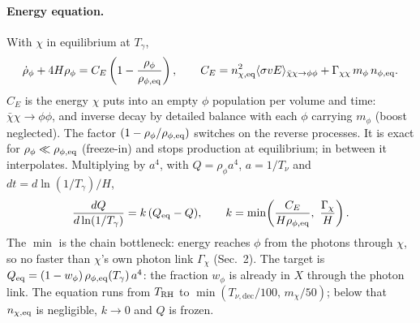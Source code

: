 \documentclass{article}
\newcommand{\Tnu}{T_{\nu,\mathrm{dec}}}
\begin{document}
\paragraph{Energy equation.} With $\chi$ in equilibrium at $T_\gamma$,
\begin{equation}
  \dot\rho_\phi + 4H\rho_\phi = C_E\left(1 - \frac{\rho_\phi}{\rho_{\phi,\rm eq}}\right),\qquad
  C_E = n_{\chi,\rm eq}^2\langle\sigma v E\rangle_{\bar\chi\chi\to\phi\phi}
      + \Gamma_{\chi\chi}\,m_\phi\,n_{\phi,\rm eq}.
\end{equation}
$C_E$ is the energy $\chi$ puts into an empty $\phi$ population per volume and time:
$\bar\chi\chi\to\phi\phi$, and inverse decay by detailed balance with each $\phi$
carrying $m_\phi$ (boost neglected). The factor $(1-\rho_\phi/\rho_{\phi,\rm eq})$
switches on the reverse processes. It is exact for $\rho_\phi\ll\rho_{\phi,\rm eq}$
(freeze-in) and stops production at equilibrium; in between it interpolates.
Multiplying by $a^4$, with $Q=\rho_\phi a^4$, $a = 1/T_\nu$ and
$dt = d\ln(1/T_\gamma)/H$,
\begin{equation}
  \frac{dQ}{d\ln(1/T_\gamma)} = k\,(Q_{\rm eq} - Q),\qquad
  k = \min\!\left(\frac{C_E}{H\rho_{\phi,\rm eq}},\ \frac{\Gamma_\chi}{H}\right).
\end{equation}
The $\min$ is the chain bottleneck: energy reaches $\phi$ from the photons through
$\chi$, so no faster than $\chi$'s own photon link $\Gamma_\chi$ (Sec.~2). The
target is $Q_{\rm eq} = (1-w_\phi)\,\rho_{\phi,\rm eq}(T_\gamma)\,a^4$: the fraction
$w_\phi$ is already in $X$ through the photon link. The equation runs from
$T_{\rm RH}$ to $\min(\Tnu/100,\,m_\chi/50)$; below that $n_{\chi,\rm eq}$ is
negligible, $k\to0$ and $Q$ is frozen.
\end{document}
